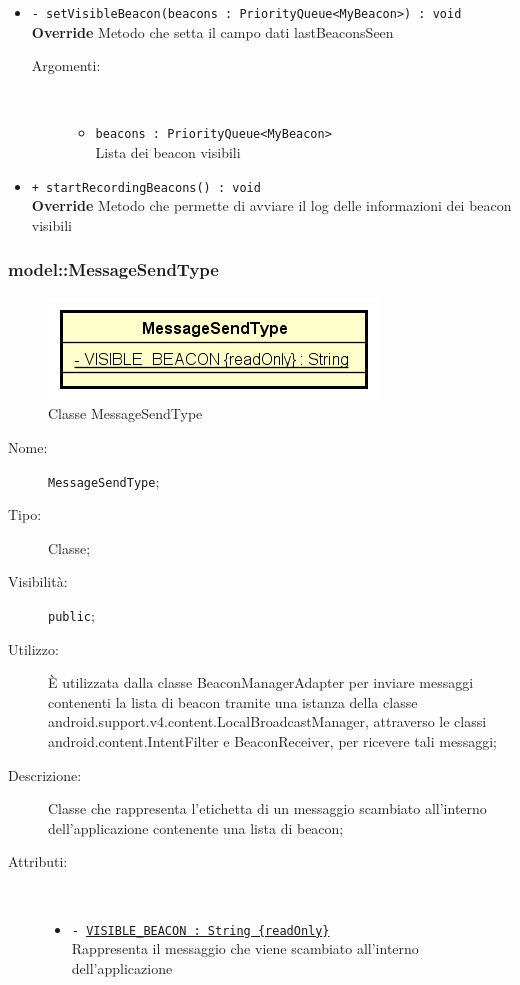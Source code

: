 \documentclass[../DefinizioneDiProdotto.tex]{subfiles}
\begin{document}
\begin{description}
\begin{itemize}
\begin{description}
\end{description}
\item \texttt{- setVisibleBeacon(beacons : PriorityQueue<MyBeacon>) : void}\\
\textbf{Override} Metodo che setta il campo dati lastBeaconsSeen
 \begin{description}
\item[Argomenti:] \
\begin{itemize}
\item \texttt{beacons : PriorityQueue<MyBeacon>}\\
Lista dei beacon visibili\end{itemize}
\end{description}
\item \texttt{+ startRecordingBeacons() : void}\\
\textbf{Override} Metodo che permette di avviare il log delle informazioni dei beacon visibili
 \end{itemize}
\end{description}

\subsubsection{model::MessageSendType}

    \begin{figure}[H]
        \centering
        \includegraphics{img/MessageSendType.png}
        \caption{Classe MessageSendType}\label{fig:model::MessageSendType} 
    \end{figure}
    \begin{description}
\item[Nome:] \texttt{MessageSendType};
\item[Tipo:] Classe;
\item[Visibilità:] \texttt{public};
\item[Utilizzo:] È utilizzata dalla classe BeaconManagerAdapter per inviare messaggi contenenti la lista di beacon tramite una istanza della classe android.support.v4.content.LocalBroadcastManager, attraverso le classi android.content.IntentFilter e BeaconReceiver, per ricevere tali messaggi;
\item[Descrizione:] Classe che rappresenta l'etichetta di un messaggio scambiato all'interno dell'applicazione contenente una lista di beacon;
\item[Attributi:] \
\begin{itemize}
\item \texttt{- \underline{VISIBLE\_BEACON : String \{readOnly\}}}\\
Rappresenta il messaggio che viene scambiato all'interno dell'applicazione

\end{itemize}
\end{description}
\end{document}
